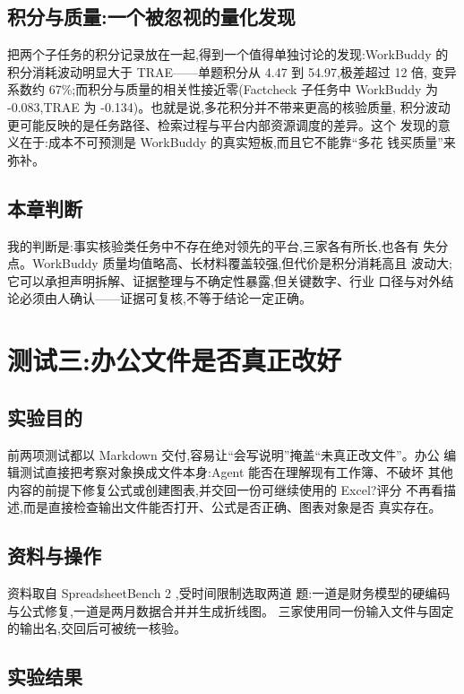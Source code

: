 \documentclass[
  12pt,
  a4paper,
  oneside,
  headings=normal,
  numbers=noendperiod,
  listof=totoc,
  bibliography=totoc
]{scrreprt}
\begin{document}
\section{积分与质量:一个被忽视的量化发现}

把两个子任务的积分记录放在一起,得到一个值得单独讨论的发现:WorkBuddy
的积分消耗波动明显大于 TRAE——单题积分从 4.47 到 54.97,极差超过 12 倍,
变异系数约 67\%;而积分与质量的相关性接近零(Factcheck 子任务中 WorkBuddy
为 -0.083,TRAE 为 -0.134)。也就是说,多花积分并不带来更高的核验质量,
积分波动更可能反映的是任务路径、检索过程与平台内部资源调度的差异。这个
发现的意义在于:成本不可预测是 WorkBuddy 的真实短板,而且它不能靠“多花
钱买质量”来弥补。

\section{本章判断}

我的判断是:事实核验类任务中不存在绝对领先的平台,三家各有所长,也各有
失分点。WorkBuddy 质量均值略高、长材料覆盖较强,但代价是积分消耗高且
波动大;它可以承担声明拆解、证据整理与不确定性暴露,但关键数字、行业
口径与对外结论必须由人确认——证据可复核,不等于结论一定正确。

\chapter{测试三:办公文件是否真正改好}

\section{实验目的}

前两项测试都以 Markdown 交付,容易让“会写说明”掩盖“未真正改文件”。办公
编辑测试直接把考察对象换成文件本身:Agent 能否在理解现有工作簿、不破坏
其他内容的前提下修复公式或创建图表,并交回一份可继续使用的 Excel?评分
不再看描述,而是直接检查输出文件能否打开、公式是否正确、图表对象是否
真实存在。

\section{资料与操作}

资料取自 SpreadsheetBench 2 \citep{spreadsheetbench},受时间限制选取两道
题:一道是财务模型的硬编码与公式修复,一道是两月数据合并并生成折线图。
三家使用同一份输入文件与固定的输出名,交回后可被统一核验。

\section{实验结果}
\end{document}

